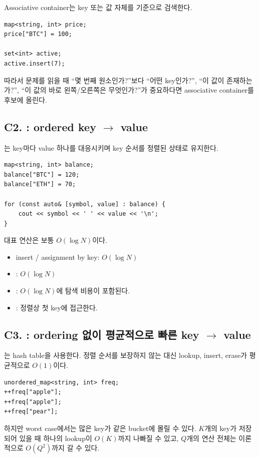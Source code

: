 Associative container는 key 또는 값 자체를 기준으로 검색한다.
\begin{lstlisting}
map<string, int> price;
price["BTC"] = 100;

set<int> active;
active.insert(7);
\end{lstlisting}

따라서 문제를 읽을 때 ``몇 번째 원소인가?''보다 ``어떤 key인가?'', ``이 값이 존재하는가?'', ``이 값의 바로 왼쪽/오른쪽은 무엇인가?''가 중요하다면 associative container를 후보에 올린다.

\subsection{C2. : ordered key $\to$ value}
는 key마다 value 하나를 대응시키며 key 순서를 정렬된 상태로 유지한다.
\begin{lstlisting}
map<string, int> balance;
balance["BTC"] = 120;
balance["ETH"] = 70;

for (const auto& [symbol, value] : balance) {
    cout << symbol << ' ' << value << '\n';
}
\end{lstlisting}

대표 연산은 보통 $O(\log N)$이다.
\begin{itemize}
\item insert / assignment by key: $O(\log N)$
\item {}: $O(\log N)$
\item {}: $O(\log N)$에 탐색 비용이 포함된다.
\item {}: 정렬상 첫 key에 접근한다.
\end{itemize}

\subsection{C3. : ordering 없이 평균적으로 빠른 key $\to$ value}
는 hash table을 사용한다. 정렬 순서를 보장하지 않는 대신 lookup, insert, erase가 평균적으로 $O(1)$이다.
\begin{lstlisting}
unordered_map<string, int> freq;
++freq["apple"];
++freq["apple"];
++freq["pear"];
\end{lstlisting}

하지만 worst case에서는 많은 key가 같은 bucket에 몰릴 수 있다. $K$개의 key가 저장되어 있을 때 하나의 lookup이 $O(K)$까지 나빠질 수 있고, $Q$개의 연산 전체는 이론적으로 $O(Q^2)$까지 갈 수 있다.

